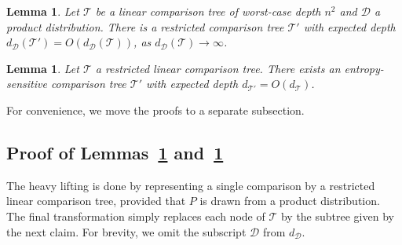 \documentclass[letterpaper,11pt]{article}
\newtheorem{lemma}[theorem]{Lemma}
\newcommand{\cD}{\mathcal{D}}
\newcommand{\cT}{\mathcal{T}}
\begin{document}
\begin{lemma}\label{lem:lin->restricted}
  Let $\cT$ be a linear 
  comparison tree of worst-case
  depth $n^2$ and $\cD$ a product
  distribution. There is a restricted 
  comparison tree $\cT'$ with expected depth 
  $d_{\cD}(\cT') = O(d_\cD(\cT))$, as 
  $d_\cD(\cT) \rightarrow\infty$.
\end{lemma}

\begin{lemma}\label{lem:restricted->entropy}
  Let $\cT$ a restricted linear comparison 
  tree. 
  There exists an entropy-sensitive comparison
  tree $\cT'$ with expected depth $d_{\cT'} = O(d_\cT)$.
\end{lemma}


For convenience, we move the proofs to a separate subsection.

\subsection{Proof of Lemmas~\ref{lem:lin->restricted} and~\ref{lem:restricted->entropy}}
\label{sec:lin->restricted}

The heavy lifting is done by representing a single 
comparison by a restricted linear comparison 
tree, provided that $P$ is drawn from a 
product distribution. The final transformation simply
replaces each node of $\cT$ by the subtree given 
by the next claim. For brevity, we omit the 
subscript $\cD$ from $d_\cD$. 
\end{document}
